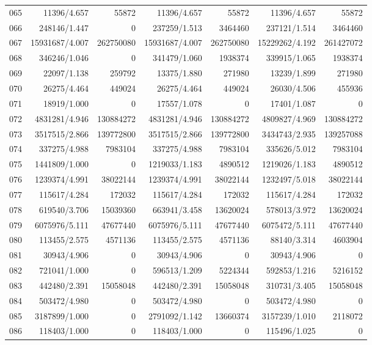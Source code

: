 \begin{longtable}{crrrrrr}
065 & 11396/4.657 & 55872 & 11396/4.657 & 55872 & 11396/4.657 & 55872 \\
066 & 248146/1.447 & 0 & 237259/1.513 & 3464460 & 237121/1.514 & 3464460 \\
067 & 15931687/4.007 & 262750080 & 15931687/4.007 & 262750080 & 15229262/4.192 & 261427072 \\
068 & 346246/1.046 & 0 & 341479/1.060 & 1938374 & 339915/1.065 & 1938374 \\
069 & 22097/1.138 & 259792 & 13375/1.880 & 271980 & 13239/1.899 & 271980 \\
070 & 26275/4.464 & 449024 & 26275/4.464 & 449024 & 26030/4.506 & 455936 \\
071 & 18919/1.000 & 0 & 17557/1.078 & 0 & 17401/1.087 & 0 \\
072 & 4831281/4.946 & 130884272 & 4831281/4.946 & 130884272 & 4809827/4.969 & 130884272 \\
073 & 3517515/2.866 & 139772800 & 3517515/2.866 & 139772800 & 3434743/2.935 & 139257088 \\
074 & 337275/4.988 & 7983104 & 337275/4.988 & 7983104 & 335626/5.012 & 7983104 \\
075 & 1441809/1.000 & 0 & 1219033/1.183 & 4890512 & 1219026/1.183 & 4890512 \\
076 & 1239374/4.991 & 38022144 & 1239374/4.991 & 38022144 & 1232497/5.018 & 38022144 \\
077 & 115617/4.284 & 172032 & 115617/4.284 & 172032 & 115617/4.284 & 172032 \\
078 & 619540/3.706 & 15039360 & 663941/3.458 & 13620024 & 578013/3.972 & 13620024 \\
079 & 6075976/5.111 & 47677440 & 6075976/5.111 & 47677440 & 6075472/5.111 & 47677440 \\
080 & 113455/2.575 & 4571136 & 113455/2.575 & 4571136 & 88140/3.314 & 4603904 \\
081 & 30943/4.906 & 0 & 30943/4.906 & 0 & 30943/4.906 & 0 \\
082 & 721041/1.000 & 0 & 596513/1.209 & 5224344 & 592853/1.216 & 5216152 \\
083 & 442480/2.391 & 15058048 & 442480/2.391 & 15058048 & 310731/3.405 & 15058048 \\
084 & 503472/4.980 & 0 & 503472/4.980 & 0 & 503472/4.980 & 0 \\
085 & 3187899/1.000 & 0 & 2791092/1.142 & 13660374 & 3157239/1.010 & 2118072 \\
086 & 118403/1.000 & 0 & 118403/1.000 & 0 & 115496/1.025 & 0 \\

\end{longtable}
